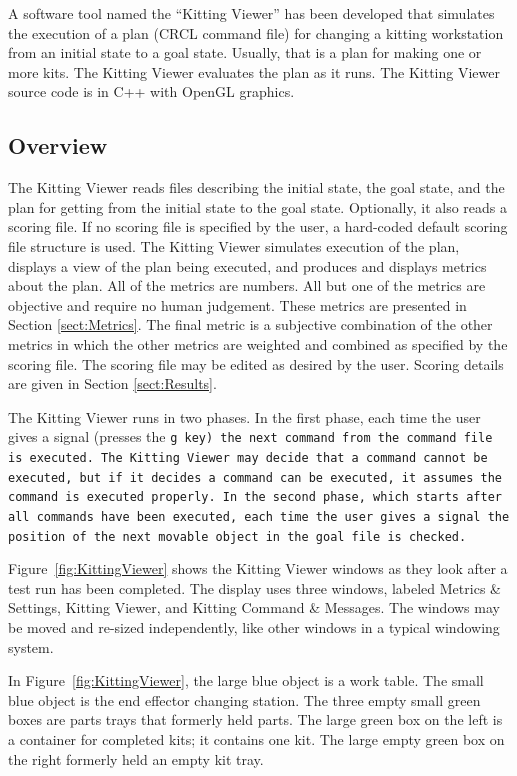 A software tool named the ``Kitting Viewer'' has been developed that
simulates the execution of a plan (CRCL command file) for changing a
kitting workstation from an initial state to a goal state. Usually, that is
a plan for making one or more kits. The Kitting Viewer evaluates the plan
as it runs. The Kitting Viewer source code is in C++ with OpenGL graphics.

\subsection{Overview}

The Kitting Viewer reads files describing the initial state, the goal state,
and the plan for getting from the initial state to the goal state.
Optionally, it also reads a scoring file. If no scoring file is specified
by the user, a hard-coded default scoring file structure is used. The
Kitting Viewer simulates execution of the plan, displays a view of the plan
being executed, and produces and displays metrics about the plan. All of
the metrics are numbers. All but one of the metrics are objective and
require no human judgement. These metrics are presented in
Section \ref{sect:Metrics}. The final metric is a subjective combination of
the other metrics in which the other metrics are weighted and combined as
specified by the scoring file. The scoring file may be edited as desired by
the user. Scoring details are given in Section \ref{sect:Results}.

The Kitting Viewer runs in two phases. In the first phase, each time the
user gives a signal (presses the \tt g \rm key) the next command from the
command file is executed. The Kitting Viewer may decide that a command
cannot be executed, but if it decides a command can be executed, it assumes
the command is executed properly. In the second phase, which starts after
all commands have been executed, each time the user gives a signal the
position of the next movable object in the goal file is checked.

Figure~\ref{fig:KittingViewer} shows the Kitting Viewer windows as they look
after a test run has been completed. The display uses three windows,
labeled Metrics \& Settings, Kitting Viewer, and Kitting Command \&
Messages. The windows may be moved and re-sized independently, like other
windows in a typical windowing system.

In Figure~\ref{fig:KittingViewer}, the large blue object is a work table.
The small blue object is the end effector changing station. The three empty
small green boxes are parts trays that formerly held parts. The large green
box on the left is a container for completed kits; it contains one kit. The
large empty green box on the right formerly held an empty kit tray.

